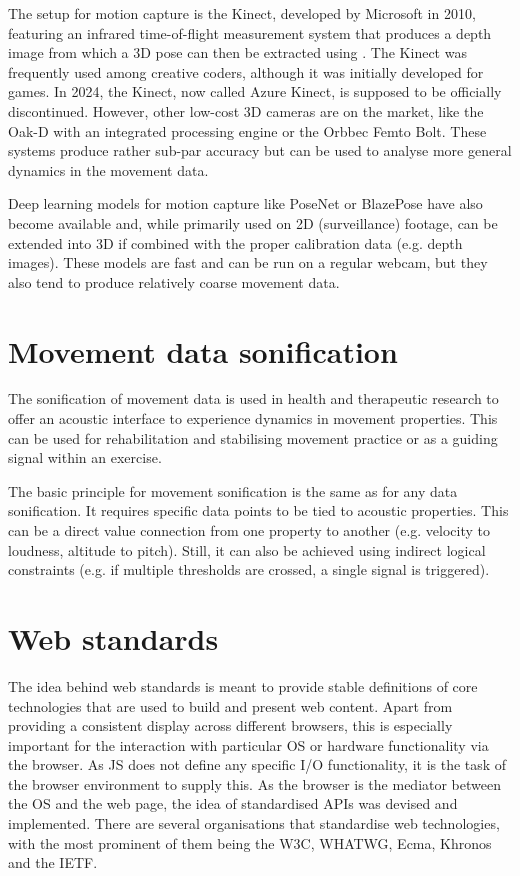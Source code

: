 The  setup for motion capture is the Kinect, developed by Microsoft in 2010, featuring an infrared time-of-flight measurement system that produces a depth image from which a 3D pose can then be extracted using . The Kinect was frequently used among creative coders, although it was initially developed for games. In 2024, the Kinect, now called Azure Kinect, is supposed to be officially discontinued. However, other low-cost 3D cameras are on the market, like the Oak-D with an integrated processing engine or the Orbbec Femto Bolt. These systems produce rather sub-par accuracy but can be used to analyse more general dynamics in the movement data.

Deep learning models for motion capture like PoseNet or BlazePose have also become available and, while primarily used on 2D (surveillance) footage, can be extended into 3D if combined with the proper calibration data (e.g. depth images). These models are fast and can be run on a regular webcam, but they also tend to produce relatively coarse movement data.

\section{Movement data sonification}

The sonification of movement data is used in health and therapeutic research to offer an acoustic interface to experience dynamics in movement properties. This can be used for rehabilitation and stabilising movement practice or as a guiding signal within an exercise.

The basic principle for movement sonification is the same as for any data sonification. It requires specific data points to be tied to acoustic properties. This can be a direct value connection from one property to another (e.g. velocity to loudness, altitude to pitch). Still, it can also be achieved using indirect logical constraints (e.g. if multiple thresholds are crossed, a single signal is triggered).

\section{Web standards}

The idea behind web standards is meant to provide stable definitions of core technologies that are used to build and present web content. Apart from providing a consistent display across different browsers, this is especially important for the interaction with particular \ac{OS} or hardware functionality via the browser. As \ac{JS} does not define any specific \ac{I/O} functionality, it is the task of the browser environment to supply this. As the browser is the mediator between the \ac{OS} and the web page, the idea of standardised \ac{API}s was devised and implemented. There are several organisations that standardise web technologies, with the most prominent of them being the \ac{W3C}, \ac{WHATWG}, Ecma, Khronos and the \ac{IETF}.

